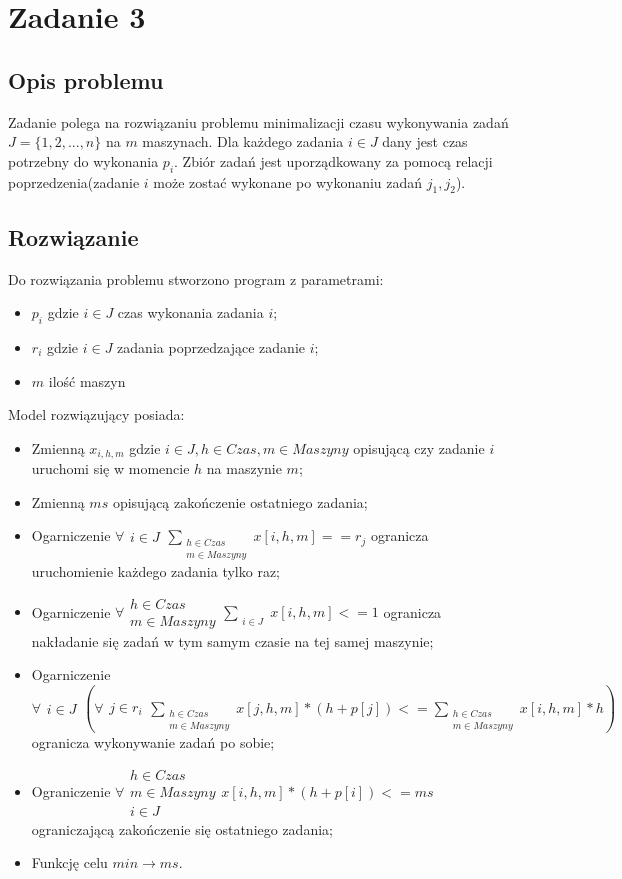 \chapter{Zadanie 3}
\thispagestyle{chapterBeginStyle}
\label{rozdzial3}
\section{Opis problemu}
Zadanie polega na rozwiązaniu problemu minimalizacji czasu wykonywania zadań $J = \{1,2,...,n\}$ na $m$ maszynach.
Dla każdego zadania $i \in J$ dany jest czas potrzebny do wykonania $p_i$. 
Zbiór zadań jest uporządkowany za pomocą relacji poprzedzenia(zadanie 
$i$ może zostać wykonane po wykonaniu zadań $j_1,j_2$). 

\section{Rozwiązanie}
Do rozwiązania problemu stworzono program z parametrami: 
\begin{itemize}
    \item $p_i$ gdzie $i \in J$ czas wykonania zadania $i$;
    \item $r_i$ gdzie $i \in J$ zadania poprzedzające zadanie $i$;
    \item $m$ ilość maszyn 
\end{itemize}

Model rozwiązujący posiada:

\begin{itemize}
    \item Zmienną $x_{i,h,m}$ gdzie $i \in J, h \in Czas, m \in Maszyny$ opisującą czy zadanie $i$ uruchomi się w momencie $h$ na maszynie $m$;
    \item Zmienną $ms$ opisującą zakończenie ostatniego zadania;
    \item Ogarniczenie $\forall \substack{i \in J} \sum_{\substack{h \in Czas \\ m \in Maszyny}} x[i,h,m] == r_j$ 
    ogranicza uruchomienie każdego zadania tylko raz;
    \item Ogarniczenie $\forall \substack{h \in Czas \\ m \in Maszyny} \sum_{\substack{i \in J}} x[i,h,m] <= 1$ 
    ogranicza nakładanie się zadań w tym samym czasie na tej samej maszynie;
    \item Ogarniczenie $\forall \substack{i \in J} (\forall \substack{j \in r_i} \sum_{\substack{h \in Czas \\ m \in Maszyny}} x[j, h, m] * (h + p[j]) <= \sum_{\substack{h \in Czas \\ m \in Maszyny}} x[i, h, m] * h)$ ogranicza wykonywanie zadań po sobie;
    \item Ograniczenie $\forall \substack{h \in Czas \\ m \in Maszyny \\ i \in J} x[i, h, m] * (h + p[i]) <= ms$ ograniczającą zakończenie się ostatniego zadania;
    \item Funkcję celu $min \rightarrow ms$.
\end{itemize}


